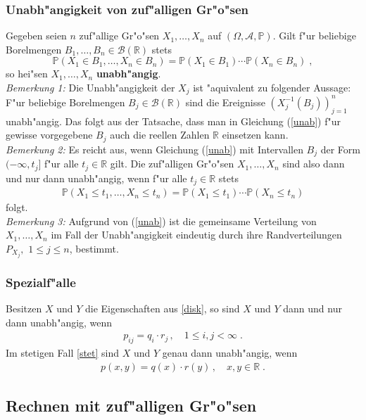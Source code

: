 \documentclass[ngerman,draft,parskip=half,twoside]{scrartcl}
\newcommand*{\R}{\mathbb{R}}      %
\newcommand*{\Algeb}{\mathcal{A}}   %
\newcommand*{\BorelM}{\mathcal{B}}  %
\newcommand*{\WKM}{\mathbb{P}}      %
\begin{document}
\subsubsection{Unabh"angigkeit von zuf"alligen Gr"o"sen}
Gegeben seien $n$ zuf"allige Gr"o"sen $X_1,\ldots,X_n$ auf $(\Omega,\Algeb,\WKM)$. Gilt f"ur beliebige
Borelmengen $B_1,\ldots,B_n\in\BorelM(\R)$ stets
\begin{equation}
\label{unab}
\WKM(X_1\in B_1,\ldots,X_n\in B_n)=\WKM(X_1\in B_1)\cdots\WKM(X_n\in B_n)\;,
\end{equation}
so hei"sen $X_1,\ldots,X_n$ \textbf{unabh"angig}.\\
\textit{Bemerkung 1:} Die Unabh"angigkeit der $X_j$ ist "aquivalent zu folgender Aussage: F"ur
beliebige Borelmengen $B_j\in\BorelM(\R)$ sind die Ereignisse $\left(X_j^{-1}(B_j)\right)_{j=1}^n$
unabh"angig. Das folgt aus der Tatsache, dass man in Gleichung (\ref{unab}) f"ur gewisse vorgegebene $B_j$ auch die
reellen Zahlen $\R$ einsetzen kann.\\
\textit{Bemerkung 2:} Es reicht aus, wenn Gleichung (\ref{unab}) mit Intervallen $B_j$ der Form
$(-\infty,t_j]$ f"ur alle $t_j\in\R$ gilt. Die zuf"alligen Gr"o"sen $X_1,\ldots,X_n$ sind also
dann und nur dann unabh"angig, wenn f"ur alle $t_j\in\R$ stets
\begin{gather*}
  \WKM(X_1\le t_1,\ldots,X_n\le t_n)=\WKM(X_1\le t_1)\cdots\WKM(X_n\le t_n)
\end{gather*}
folgt.\\
\textit{Bemerkung 3:} Aufgrund von (\ref{unab}) ist die gemeinsame Verteilung von $X_1,\ldots,X_n$
im Fall der Unabh"angigkeit eindeutig durch
ihre Randverteilungen $P_{X_j},$ $1\le j\le n$, bestimmt.
\subsubsection{Spezialf"alle}
Besitzen $X$ und $Y$ die Eigenschaften aus \ref{disk}, so sind $X$ und $Y$ dann und nur  dann
unabh"angig, wenn
\begin{gather*}
  p_{ij}=q_i\cdot r_j\,,\quad 1\le i,j<\infty\;.
\end{gather*}
Im stetigen Fall \ref{stet} sind $X$ und $Y$ genau dann unabh"angig, wenn
\begin{gather*}
  p(x,y)=q(x)\cdot r(y)\,,\quad x,y\in\R\;.
\end{gather*}
\subsection{Rechnen mit zuf"alligen Gr"o"sen}
\end{document}
